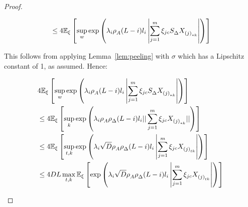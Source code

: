 \begin{proof}
\begin{small}
\begin{equation}
\begin{aligned}
&\leq 4\mathbb{E}_{\xi}\left[ \sup_{w}  \exp \left(\lambda_i \rho^{}_A  (L-i) l_i \left| \sum_{j=1}^m \xi_{jc}   S^{}_{\Delta} X^{}_{{(j)}_{*k}} \right| \right)\right] \\
\end{aligned}
\end{equation}
\end{small}
This follows from applying Lemma~\ref{lem:peeling} with $\sigma$ which has a Lipschitz constant of 1, as assumed. Hence:
\begin{small}
\begin{equation} \label{eq:lip}
\begin{aligned}
& 4\mathbb{E}_{\xi}\left[ \sup_{w}  \exp \left( \lambda_i \rho^{}_A  (L-i) l_i \left| \sum_{j=1}^m \xi_{jc} S^{}_{\Delta} X^{}_{{(j)}_{*k}} \right| \right)\right] \\
&\leq 4\mathbb{E}_{\xi}\left[ \sup_{k}  \exp \left( \lambda_i \rho^{}_A \rho^{}_{\Delta} (L-i) l_i || \sum_{j=1}^m \xi_{jc} X^{}_{{(j)}_{*k}} || \right)\right] \\
&\leq 4\mathbb{E}_{\xi}\left[ \sup_{t,k}  \exp \left( \lambda_i \sqrt{D} \rho^{}_A \rho^{}_{\Delta} (L-i) l_i \left| \sum_{j=1}^m \xi_{jc} X^{}_{{(j)}_{tk}} \right| \right)\right] \\
&\leq 4DL \max_{t, k} \mathbb{E}_{\xi}\left[ \exp \left(\lambda_i \sqrt{D} \rho^{}_A \rho^{}_{\Delta} (L-i) l_i  \left|  \sum_{j=1}^m \xi_{jc} X^{}_{{(j)}_{tk}}  \right| \right)\right] \\
\end{aligned}
\end{equation}
\end{small}


\end{proof}
